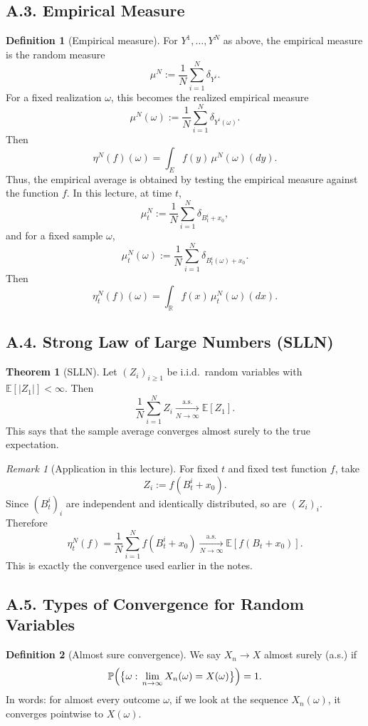 \documentclass[11pt]{article}
\theoremstyle{definition}
\newtheorem{definition}{Definition}
\newtheorem{theorem}{Theorem}
\theoremstyle{remark}
\newtheorem{remark}{Remark}
\begin{document}
\subsection*{A.3. Empirical Measure}
\begin{definition}[Empirical measure]
For $Y^1,\dots,Y^N$ as above, the empirical measure is the random measure
\[
\mu^N:=\frac{1}{N}\sum_{i=1}^N \delta_{Y^i}.
\]
For a fixed realization $\omega$, this becomes the realized empirical measure
\[
\mu^N(\omega):=\frac{1}{N}\sum_{i=1}^N \delta_{Y^i(\omega)}.
\]
Then
\[
\eta^N(f)(\omega)=\int_E f(y)\,\mu^N(\omega)(dy).
\]
Thus, the empirical average is obtained by testing the empirical measure against the function $f$. In this lecture, at time $t$,
\[
\mu_t^N:=\frac{1}{N}\sum_{i=1}^N \delta_{B_t^i+x_0},
\]
and for a fixed sample $\omega$,
\[
\mu_t^N(\omega):=\frac{1}{N}\sum_{i=1}^N \delta_{B_t^i(\omega)+x_0}.
\]
Then
\[
\eta_t^N(f)(\omega)=\int_{\mathbb R} f(x)\,\mu_t^N(\omega)(dx).
\]
\end{definition}

\subsection*{A.4. Strong Law of Large Numbers (SLLN)}
\begin{theorem}[SLLN]
Let $(Z_i)_{i\ge1}$ be i.i.d.\ random variables with $\mathbb E[|Z_1|]<\infty$. Then
\[
\frac{1}{N}\sum_{i=1}^N Z_i
\xrightarrow[N\to\infty]{\text{a.s.}}
\mathbb E[Z_1].
\]
This says that the sample average converges almost surely to the true expectation.
\end{theorem}

\begin{remark}[Application in this lecture]
For fixed $t$ and fixed test function $f$, take
\[
Z_i:=f(B_t^i+x_0).
\]
Since $(B_t^i)_i$ are independent and identically distributed, so are $(Z_i)_i$. Therefore
\[
\eta_t^N(f)
=
\frac{1}{N}\sum_{i=1}^N f(B_t^i+x_0)
\xrightarrow[N\to\infty]{\text{a.s.}}
\mathbb E[f(B_t+x_0)].
\]
This is exactly the convergence used earlier in the notes.
\end{remark}

\subsection*{A.5. Types of Convergence for Random Variables}
\begin{definition}[Almost sure convergence]
We say $X_n\to X$ almost surely (a.s.) if
\[
\mathbb P\Bigl(\bigl\{\omega:\,\lim_{n\to\infty}X_n(\omega)=X(\omega)\bigr\}\Bigr)=1.
\]
In words: for almost every outcome $\omega$, if we look at the sequence $X_n(\omega)$, it converges pointwise to $X(\omega)$.
\end{definition}
\end{document}
